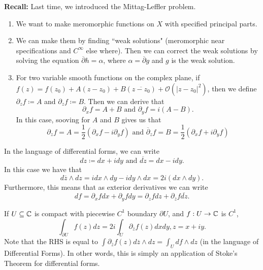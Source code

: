 \documentclass{article}
\begin{document}
{\textbf{Recall:} Last time, we introduced the Mittag-Leffler problem.
\begin{enumerate}
    \item We want to make meromorphic functions on $X$ with specified principal parts.
    \item We can make them by finding ``weak solutions" (meromorphic near specifications and $C^\infty$ else where). Then we can correct the weak solutions by solving the equation $\overline{\partial} h = \alpha$, where $\alpha = \overline{\partial} g$ and $g$ is the weak solution.
    \item For two variable smooth functions on the complex plane, if $f(z) = f(z_0) + A(z - z_0) + B(\overline{z - z_0}) + \mathcal{O}(|z - z_0|^2)$, then we define $\partial_z f \coloneqq A$ and $\partial_z f \coloneqq B$. Then we can derive that
    \[\partial_x f = A + B \text{ and } \partial_y f = i(A - B).\]
    In this case, sooving for $A$ and $B$ gives us that
    \[\partial_z f = A = \frac{1}{2} (\partial_x f - i \partial_y f) \text{ and } \overline{\partial}_z f = B = \frac{1}{2}(\partial_x f + i \partial_y f)\]
\end{enumerate}

\begin{remark}
    In the language of differential forms, we can write
    \[dz \coloneqq dx + idy \text{ and } \overline{dz} = dx - idy.\]
    In this case we have that
    \[d\overline{z} \wedge dz = i dx \wedge dy - i dy \wedge dx = 2i (dx \wedge dy).\]
    Furthermore, this means that as exterior derivatives we can write
    \[df = \partial_x f dx + \partial_y f dy = \partial_z f dz + \partial_{\overline{z}} f \overline{dz}.\]
\end{remark}

\begin{theorem}
    If $U \subseteq \mathbb{C}$ is compact with piecewise $C^1$ boundary $\partial U$, and $f: U \to \mathbb{C}$ is $C^1$, 
    \[\int_{\partial U} f(z) dz = 2i \int_{U} \partial_{\overline{z}} f(z) dx dy, z = x + iy.\]
    Note that the RHS is equal to $\int \partial_{\overline{z}} f(z) d\overline{z} \wedge dz = \int_U df \wedge dz$ (in the language of Differential Forms). In other words, this is simply an application of Stoke's Theorem for differential forms.
\end{theorem}

}
\end{document}
